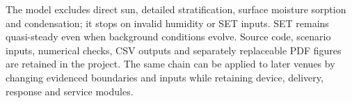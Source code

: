 The model excludes direct sun, detailed stratification, surface moisture sorption and condensation; it stops on invalid humidity or SET inputs. SET remains quasi-steady even when background conditions evolve. Source code, scenario inputs, numerical checks, CSV outputs and separately replaceable PDF figures are retained in the project. The same chain can be applied to later venues by changing evidenced boundaries and inputs while retaining device, delivery, response and service modules.
